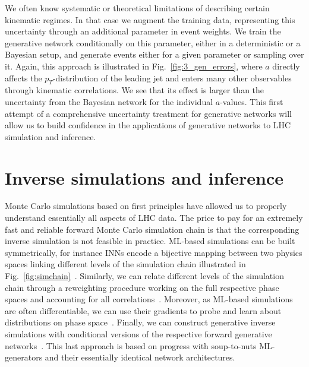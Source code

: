 \documentclass[submission,Phys]{SciPost}
\begin{document}
We often know systematic or theoretical limitations of describing certain kinematic regimes. In that case we augment the training data, representing this uncertainty through an additional parameter in event weights. We train the generative network conditionally on this parameter, either in a deterministic or a Bayesian setup, and generate events either for a given parameter or sampling over it. Again, this approach is illustrated in  Fig.~\ref{fig:3_gen_errors}, where $a$ directly affects the $p_T$-distribution of the leading jet and enters many other observables through kinematic correlations. We see that its effect is larger than the uncertainty from the Bayesian network for the individual $a$-values. This first attempt of a comprehensive uncertainty treatment for generative networks will allow us to build confidence in the applications of generative networks to LHC simulation and inference.

\section{Inverse simulations and inference}
\label{sec:inverse}

Monte Carlo simulations based on first principles have allowed us to properly understand essentially all aspects of LHC data. The price to pay for an extremely fast and reliable forward Monte Carlo simulation chain is that the corresponding inverse simulation is not feasible in practice. ML-based simulations can be built symmetrically, for instance INNs encode a bijective mapping between two physics spaces linking different levels of the simulation chain illustrated in Fig.~\ref{fig:simchain}~\cite{Datta:2018mwd,Bellagente:2020piv}. Similarly, we can relate different levels of the simulation chain through a reweighting procedure working on the full respective phase spaces and accounting for all correlations~\cite{Andreassen:2019cjw}. Moreover, as ML-based simulations are often differentiable, we can use their gradients to probe and learn about distributions on phase space~\cite{Vandegar:2020yvw}. Finally, we can construct generative inverse simulations with conditional versions of the respective forward generative networks~\cite{cinn,Bellagente:2019uyp,Bellagente:2020piv}. This last approach is based on progress with soup-to-nuts ML-generators and their essentially identical network architectures.

\end{document}
